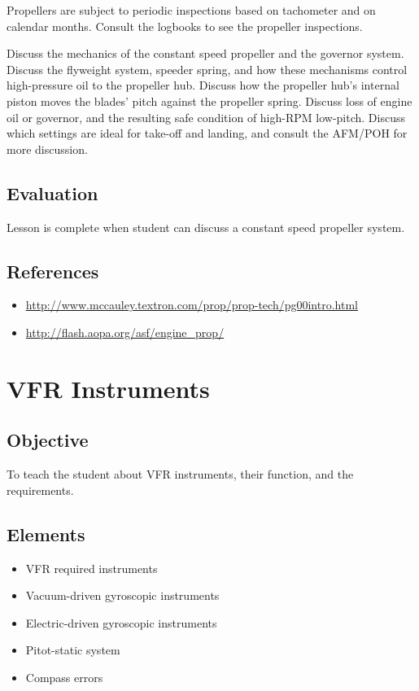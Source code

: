 \documentclass[twoside,openright]{report}
\begin{document}
Propellers are subject to periodic inspections based on tachometer and on
calendar months. Consult the logbooks to see the propeller inspections.

Discuss the mechanics of the constant speed propeller and the governor system.
Discuss the flyweight system, speeder spring, and how these mechanisms control
high-pressure oil to the propeller hub. Discuss how the propeller hub's
internal piston moves the blades' pitch against the propeller spring. Discuss
loss of engine oil or governor, and the resulting safe condition of high-RPM
low-pitch. Discuss which settings are ideal for take-off and landing, and
consult the AFM/POH for more discussion.

\section{Evaluation}

Lesson is complete when student can discuss a constant speed propeller system.

\section{References}

\begin{itemize}
  \item \url{http://www.mccauley.textron.com/prop/prop-tech/pg00intro.html}

  \item \url{http://flash.aopa.org/asf/engine_prop/}
\end{itemize}

\chapter{VFR Instruments}

\section{Objective}

To teach the student about VFR instruments, their function, and the
requirements.

\section{Elements}

\begin{itemize}
  \item VFR required instruments
  \item Vacuum-driven gyroscopic instruments
  \item Electric-driven gyroscopic instruments
  \item Pitot-static system
  \item Compass errors
\end{itemize}
\end{document}
